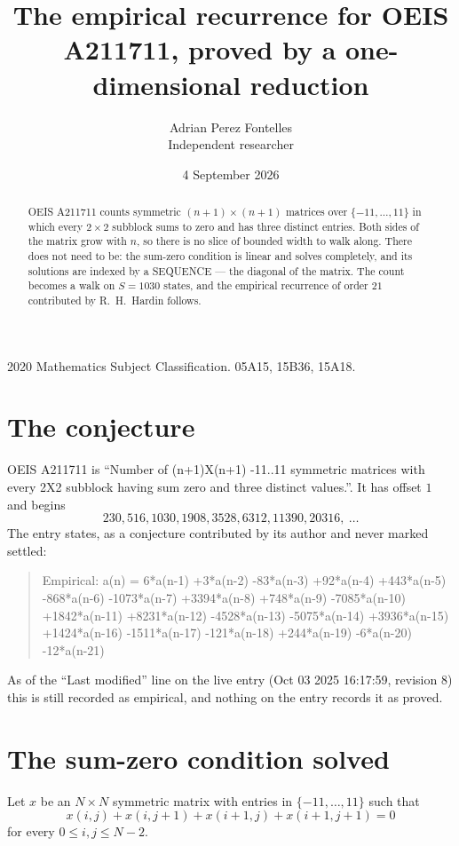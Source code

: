 \documentclass[11pt,a4paper]{article}
\title{The empirical recurrence for OEIS A211711, proved by a one-dimensional reduction}
\author{Adrian Perez Fontelles\\ \small Independent researcher}
\date{4 September 2026}
\theoremstyle{plain}
\theoremstyle{definition}
\begin{document}
\maketitle

\begin{abstract}
OEIS A211711 counts symmetric $(n+1)\times(n+1)$ matrices over
$\{-11,\dots,11\}$ in which every $2\times2$ subblock sums to zero and has three distinct
entries. Both sides of the matrix grow with $n$, so there is no slice of bounded width to walk
along. There does not need to be: the sum-zero condition is linear and solves completely, and
its solutions are indexed by a SEQUENCE --- the diagonal of the matrix. The count becomes a walk
on $S=1030$ states, and the empirical recurrence of order $21$ contributed by R.~H.~Hardin
follows.
\end{abstract}

\noindent\small 2020 Mathematics Subject Classification. 05A15, 15B36, 15A18.\normalsize

\section{The conjecture}

OEIS A211711 is ``Number of (n+1)X(n+1) -11..11 symmetric matrices with every 2X2 subblock having sum zero and three distinct values.''. It has offset $1$ and begins
\[
230, 516, 1030, 1908, 3528, 6312, 11390, 20316,\ \dots
\]
The entry states, as a conjecture contributed by its author and never marked settled:
\begin{quote}
Empirical: a(n) = 6*a(n-1) +3*a(n-2) -83*a(n-3) +92*a(n-4) +443*a(n-5) -868*a(n-6) -1073*a(n-7) +3394*a(n-8) +748*a(n-9) -7085*a(n-10) +1842*a(n-11) +8231*a(n-12) -4528*a(n-13) -5075*a(n-14) +3936*a(n-15) +1424*a(n-16) -1511*a(n-17) -121*a(n-18) +244*a(n-19) -6*a(n-20) -12*a(n-21)
\end{quote}
As of the ``Last modified'' line on the live entry (Oct 03 2025 16:17:59, revision 8) this is still
recorded as empirical, and nothing on the entry records it as proved.

\section{The sum-zero condition solved}

Let $x$ be an $N\times N$ symmetric matrix with entries in $\{-11,\dots,11\}$ such that
\[
x(i,j)+x(i,j{+}1)+x(i{+}1,j)+x(i{+}1,j{+}1)=0
\]
for every $0\le i,j\le N-2$.
\end{document}
